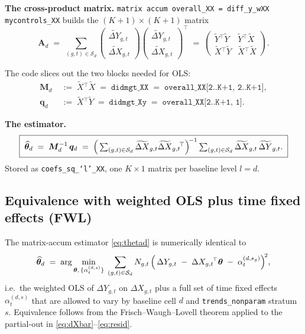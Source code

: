 \documentclass[11pt]{article}
\newcommand{\code}[1]{\texttt{\small #1}}
\newcommand{\1}{\mathbb{1}}
\newcommand{\Smpl}{\mathcal{S}}
\newcommand{\thetad}{\widehat{\bm{\theta}}_d}
\newcommand{\Ngt}{N_{g,t}}
\newcommand{\dY}{\Delta Y_{g,t}}
\newcommand{\dX}{\Delta X_{g,t}}
\begin{document}
\noindent\textbf{The cross-product matrix.}
\code{matrix accum overall\_XX = diff\_y\_wXX mycontrols\_XX} builds the
$(K{+}1)\times(K{+}1)$ matrix
\begin{equation}
\bm{A}_d
\;=\;
\sum_{(g,t)\in\Smpl_d}
\begin{pmatrix}
\widetilde{\Delta Y}_{g,t} \\[2pt]
\widetilde{\Delta X}_{g,t}
\end{pmatrix}
\begin{pmatrix}
\widetilde{\Delta Y}_{g,t} \\[2pt]
\widetilde{\Delta X}_{g,t}
\end{pmatrix}^{\!\top}
\;=\;
\begin{pmatrix}
\widetilde{Y}{}^{\!\top}\widetilde{Y} & \widetilde{Y}{}^{\!\top}\widetilde{X} \\[2pt]
\widetilde{X}{}^{\!\top}\widetilde{Y} & \widetilde{X}{}^{\!\top}\widetilde{X}
\end{pmatrix}.
\label{eq:accum}
\end{equation}

\noindent The code slices out the two blocks needed for OLS:
\begin{align}
\bm{M}_d \;&:=\; \widetilde{X}{}^{\!\top}\widetilde{X} \;=\; \texttt{didmgt\_XX} \;=\; \texttt{overall\_XX[2..K+1, 2..K+1]}, \label{eq:Md}\\
\bm{q}_d \;&:=\; \widetilde{X}{}^{\!\top}\widetilde{Y} \;=\; \texttt{didmgt\_Xy} \;=\; \texttt{overall\_XX[2..K+1, 1]}. \label{eq:qd}
\end{align}

\noindent\textbf{The estimator.}
\begin{equation}
\boxed{\;\thetad \;=\; \bm{M}_d^{-1}\,\bm{q}_d
\;=\;
\Bigl(\,\textstyle\sum_{(g,t)\in\Smpl_d}\widetilde{\Delta X}_{g,t}\widetilde{\Delta X}_{g,t}{}^{\!\top}\Bigr)^{\!-1}
\sum_{(g,t)\in\Smpl_d}\widetilde{\Delta X}_{g,t}\,\widetilde{\Delta Y}_{g,t}.\;}
\label{eq:thetad}
\end{equation}
Stored as \code{coefs\_sq\_`l'\_XX}, one $K\times 1$ matrix per baseline level
$l=d$.

\subsection*{Equivalence with weighted OLS plus time fixed effects (FWL)}

The matrix-accum estimator \eqref{eq:thetad} is numerically identical to
\begin{equation}
\thetad \;=\; \arg\min_{\bm{\theta},\,\{\alpha_t^{(d,s)}\}}\;
\sum_{(g,t)\in\Smpl_d} \Ngt\,\Bigl(\,\dY \;-\; \dX{}^{\!\top}\bm{\theta} \;-\; \alpha_t^{(d,s_g)}\Bigr)^{\!2},
\label{eq:fwl}
\end{equation}
i.e.\ the weighted OLS of $\dY$ on $\dX$ plus a full set of time fixed effects
$\alpha_t^{(d,s)}$ that are allowed to vary by baseline cell $d$ and
\texttt{trends\_nonparam} stratum $s$. Equivalence follows from the
Frisch--Waugh--Lovell theorem applied to the partial-out in
\eqref{eq:dXbar}--\eqref{eq:resid}.
\end{document}
